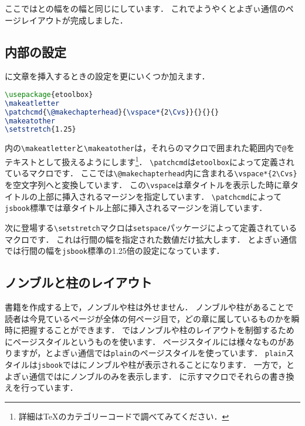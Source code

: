 ここではとの幅をの幅と同じにしています．
これでようやくとよぎぃ通信のページレイアウトが完成しました．

\subsection{内部の設定}

に文章を挿入するときの設定を更にいくつか加えます． 
\begin{lstlisting}[caption = \jyquote{本文}内文章の設定, label = list:body, language = tex]
\usepackage{etoolbox}
\makeatletter
\patchcmd{\@makechapterhead}{\vspace*{2\Cvs}}{}{}{}
\makeatother
\setstretch{1.25}
\end{lstlisting}

内の\verb|\makeatletter|と\verb|\makeatother|は，それらのマクロで囲まれた範囲内で\texttt{@}をテキストとして扱えるようにします\footnote{詳細は{\TeX}のカテゴリーコードで調べてみてください．}．
\verb|\patchcmd|は\verb|etoolbox|によって定義されているマクロです．
ここでは\verb|\@makechapterhead|内に含まれる\verb|\vspace*{2\Cvs}|を空文字列へと変換しています．
この\verb|\vspace|は章タイトルを表示した時に章タイトルの上部に挿入されるマージンを指定しています．
\verb|\patchcmd|によって\texttt{jsbook}標準では章タイトル上部に挿入されるマージンを消しています．

次に登場する\verb|\setstretch|マクロは\texttt{setspace}パッケージによって定義されているマクロです．
これは行間の幅を指定された数値だけ拡大します．
とよぎぃ通信では行間の幅を\texttt{jsbook}標準の1.25倍の設定になっています．

\subsection{ノンブルと柱のレイアウト}

書籍を作成する上で，ノンブルや柱は外せません．
ノンブルや柱があることで読者は今見ているページが全体の何ページ目で，どの章に属しているものかを瞬時に把握することができます．
{\pLaTeX}ではノンブルや柱のレイアウトを制御するためにページスタイルというものを使います．
ページスタイルには様々なものがありますが，とよぎぃ通信では\verb|plain|のページスタイルを使っています．
\texttt{plain}スタイルは\texttt{jsbook}ではにノンブルや柱が表示されることになります．
一方で，とよぎぃ通信ではにノンブルのみを表示します．
に示すマクロでそれらの書き換えを行っています．

